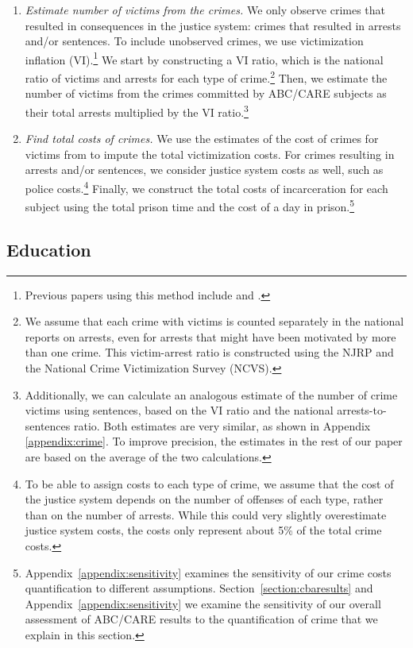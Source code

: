 \begin{enumerate}
\item \textit{Estimate number of victims from the crimes.} We only observe crimes that resulted in consequences in the justice system: crimes that resulted in arrests and/or sentences. To include unobserved crimes, we use victimization inflation (VI).\footnote{Previous papers using this method include \citet{Belfield_Nores_etal_2006_JHR} and \cite{Heckman_Moon_etal_2010_RateofReturn}.} We start by constructing a VI ratio, which is the national ratio of victims and arrests for each type of crime.\footnote{We assume that each crime with victims is counted separately in the national reports on arrests, even for arrests that might have been motivated by more than one crime. This victim-arrest ratio is constructed using the NJRP and the National Crime Victimization Survey (NCVS).} Then, we estimate the number of victims from the crimes committed by ABC/CARE subjects as their total arrests multiplied by the VI ratio.\footnote{Additionally, we can calculate an analogous estimate of the number of crime victims using sentences, based on the VI ratio and the national arrests-to-sentences ratio. Both estimates are very similar, as shown in Appendix \ref{appendix:crime}. To improve precision, the estimates in the rest of our paper are based on the average of the two calculations.}

\item \textit{Find total costs of crimes.} We use the estimates of the cost of crimes for victims from \cite{McCollister_etal_2010_DAD} to impute the total victimization costs. For crimes resulting in arrests and/or sentences, we consider justice system costs as well, such as police costs.\footnote{To be able to assign costs to each type of crime, we assume that the cost of the justice system depends on the number of offenses of each type, rather than on the number of arrests. While this could very slightly overestimate justice system costs, the costs only represent about 5\% of the total crime costs.} Finally, we construct the total costs of incarceration for each subject using the total prison time and the cost of a day in prison.\footnote{Appendix~\ref{appendix:sensitivity} examines the sensitivity of our crime costs quantification to different assumptions. Section~\ref{section:cbaresults} and Appendix~\ref{appendix:sensitivity} we examine the sensitivity of our overall assessment of ABC/CARE results to the quantification of crime that we explain in this section.}
\end{enumerate}

\subsection{Education}

